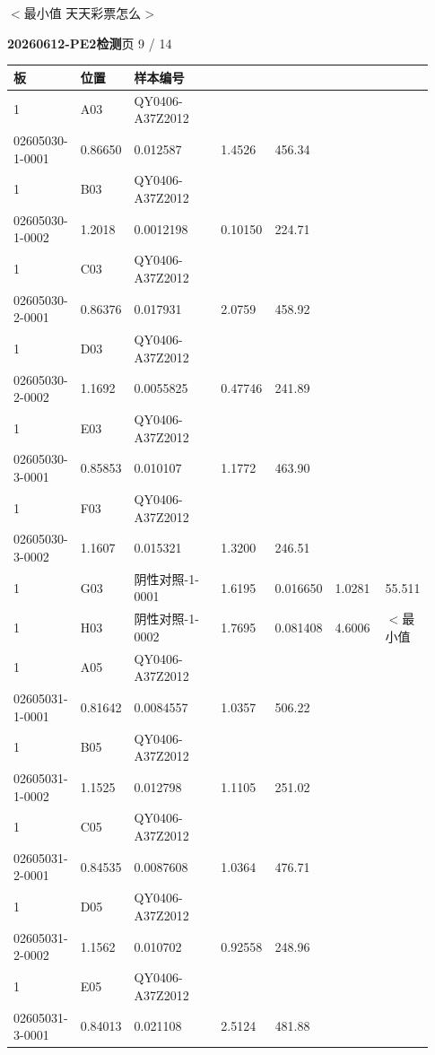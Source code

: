 \documentclass[UTF8,10pt,a4paper,fontset=fandol]{ctexart}
\begin{document}
\hfill $<$最小值 天天彩票怎么$>$

\newpage

\noindent\textbf{20260612-PE2检测}\hfill 页 9 / 14

\vspace{0.4em}

\noindent
\scriptsize
\begin{tabular}{@{}p{0.06\linewidth}p{0.07\linewidth}p{0.29\linewidth}p{0.13\linewidth}p{0.13\linewidth}p{0.13\linewidth}p{0.12\linewidth}@{}}
\hline
板 & 位置 & 样本编号 & & & & \\
\hline
1 & A03 & QY0406-A37Z2012\\[-2pt]02605030-1-0001 & 0.86650 & 0.012587 & 1.4526 & 456.34 \\
1 & B03 & QY0406-A37Z2012\\[-2pt]02605030-1-0002 & 1.2018 & 0.0012198 & 0.10150 & 224.71 \\
1 & C03 & QY0406-A37Z2012\\[-2pt]02605030-2-0001 & 0.86376 & 0.017931 & 2.0759 & 458.92 \\
1 & D03 & QY0406-A37Z2012\\[-2pt]02605030-2-0002 & 1.1692 & 0.0055825 & 0.47746 & 241.89 \\
1 & E03 & QY0406-A37Z2012\\[-2pt]02605030-3-0001 & 0.85853 & 0.010107 & 1.1772 & 463.90 \\
1 & F03 & QY0406-A37Z2012\\[-2pt]02605030-3-0002 & 1.1607 & 0.015321 & 1.3200 & 246.51 \\
1 & G03 & 阴性对照-1-0001 & 1.6195 & 0.016650 & 1.0281 & 55.511 \\
1 & H03 & 阴性对照-1-0002 & 1.7695 & 0.081408 & 4.6006 & $<$最小值 \\
1 & A05 & QY0406-A37Z2012\\[-2pt]02605031-1-0001 & 0.81642 & 0.0084557 & 1.0357 & 506.22 \\
1 & B05 & QY0406-A37Z2012\\[-2pt]02605031-1-0002 & 1.1525 & 0.012798 & 1.1105 & 251.02 \\
1 & C05 & QY0406-A37Z2012\\[-2pt]02605031-2-0001 & 0.84535 & 0.0087608 & 1.0364 & 476.71 \\
1 & D05 & QY0406-A37Z2012\\[-2pt]02605031-2-0002 & 1.1562 & 0.010702 & 0.92558 & 248.96 \\
1 & E05 & QY0406-A37Z2012\\[-2pt]02605031-3-0001 & 0.84013 & 0.021108 & 2.5124 & 481.88 \\

\end{tabular}
\end{document}
